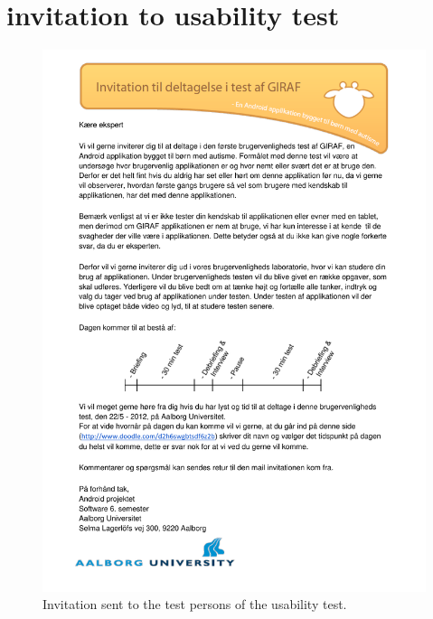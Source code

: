 \chapter{invitation to usability test}
\label{appendice:usability_test}
\begin{figure}%
	\begin{center}
	\includegraphics[width=\textwidth]{input/appendices/invitation_to_usability_test.pdf}
	\end{center}
\caption{Invitation sent to the test persons of the usability test.}%
\end{figure}